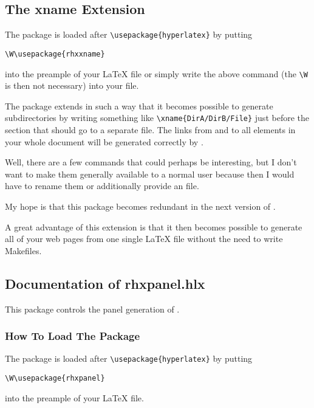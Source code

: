 \subsection{The xname Extension}

The package is loaded after \verb'\usepackage{hyperlatex}' by putting 
\begin{verbatim}
\W\usepackage{rhxxname}
\end{verbatim}
into the preample of your \LaTeX{} file or simply write the above
command (the \verb'\W' is then not necessary) into your
 file.

The package extends \HLX{} in such a way that it becomes possible to
generate subdirectories by writing something like
\verb'\xname{DirA/DirB/File}' just before the section that should go
to a separate file. The links from and to all elements in your whole
document will be generated correctly by \HLX{}.

Well, there are a few commands that could perhaps be interesting, but
I don't want to make them generally available to a normal user because
then I would have to rename them or additionally provide an
 file.

My hope is that this package becomes redundant in the next version of
\HLX{}.

A great advantage of this extension is that it then becomes possible
to generate all of your web pages from one single \LaTeX{} file
without the need to write Makefiles.











\subsection{Documentation of rhxpanel.hlx}

This package controls the panel generation of \HLX{}.


\subsubsection{How To Load The Package}
The package is loaded after \verb'\usepackage{hyperlatex}' by putting 
\begin{verbatim}
\W\usepackage{rhxpanel}
\end{verbatim}
into the preample of your \LaTeX{} file.

